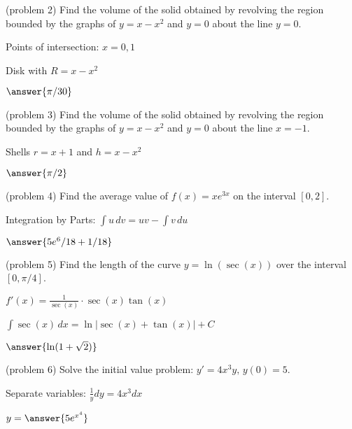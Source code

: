 \documentclass[handout]{ximera}
\begin{document}
\begin{problem}(problem 2)
Find the volume of the solid obtained by revolving the region bounded by the 
graphs of $y = x-x^2$ and $y = 0$ about the line $ y = 0$.\\
\begin{hint}
Points of intersection: $x = 0, 1$
\end{hint}
\begin{hint}
Disk with $R = x - x^2$
\end{hint}

$\answer{\pi/30}$
\end{problem}


\begin{problem}(problem 3)
Find the volume of the solid obtained by revolving the region bounded by the 
graphs of $y = x-x^2$ and $y = 0$ about the line $x = -1$.\\
\begin{hint}
Shells $r = x+1$ and $h = x-x^2$
\end{hint}
$\answer{\pi/2}$
\end{problem}


\begin{problem}(problem 4)
Find the average value of $f(x) = xe^{3x}$ on the interval $[0, 2]$.\\
\begin{hint}
Integration by Parts: $\int u \, dv = uv - \int v \, du$
\end{hint}
$\answer{5e^6/18  + 1/18}$
\end{problem}


\begin{problem}(problem 5)
Find the length of the curve $\displaystyle y = \ln(\sec(x))$ over the interval $[0, \pi/4]$.\\
\begin{hint}
$f'(x) = \frac{1}{\sec(x)} \cdot \sec(x)\tan(x)$
\end{hint}
\begin{hint}
$\int \sec(x) \, dx = \ln|\sec(x) + \tan(x)| + C$
\end{hint}
$\answer{\ln(1 + \sqrt{2})}$
\end{problem}


\begin{problem}(problem 6)
Solve the initial value problem: $\displaystyle y' = 4x^3 y,\, y(0) = 5$.\\
\begin{hint}
Separate variables: $\frac{1}{y} dy = 4x^3 dx$
\end{hint}
$y = \answer{5e^{x^4}}$
\end{problem}
\end{document}

